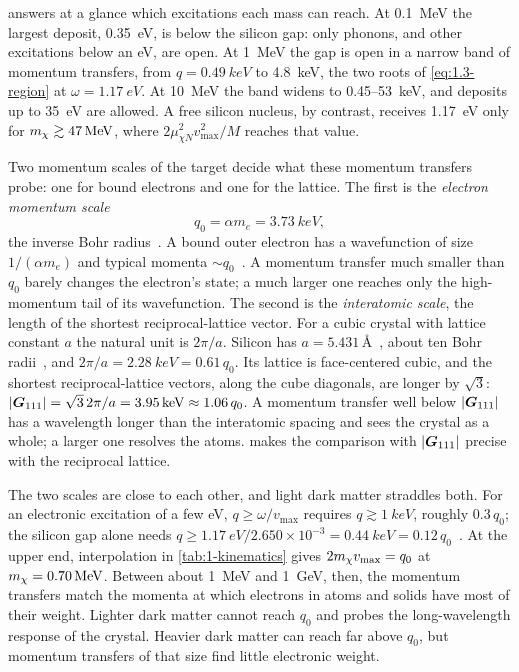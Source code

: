  answers at a glance which excitations each mass can reach. At \SI{0.1}{MeV} the largest deposit, \SI{0.35}{eV}, is below the silicon gap: only phonons, and other excitations below an eV, are open. At \SI{1}{MeV} the gap is open in a narrow band of momentum transfers, from $q = \SI{0.49}{keV}$ to \SI{4.8}{keV}, the two roots of \cref{eq:1.3-region} at $\omega = \SI{1.17}{eV}$. At \SI{10}{MeV} the band widens to 0.45--\SI{53}{keV}, and deposits up to \SI{35}{eV} are allowed. A free silicon nucleus, by contrast, receives \SI{1.17}{eV} only for $m_{\chi} \gtrsim \SI{47}{MeV}$, where $2\mu_{\chi N}^2v_{\mathrm{max}}^2/M$ reaches that value.

Two momentum scales of the target decide what these momentum transfers probe: one for bound electrons and one for the lattice. The first is the \emph{electron momentum scale}
\begin{equation}
  q_0 = \alpha m_e = \SI{3.73}{keV},
  \label{eq:1.3-q0}
\end{equation}
the inverse Bohr radius~\cite[Eq.~(121)]{kahn2022searches}. A bound outer electron has a wavefunction of size $1/(\alpha m_e)$ and typical momenta $\sim q_0$~\cite[Sect.~V\,A]{lin2019tasi}. A momentum transfer much smaller than $q_0$ barely changes the electron's state; a much larger one reaches only the high-momentum tail of its wavefunction. The second is the \emph{interatomic scale}, the length of the shortest reciprocal-lattice vector. For a cubic crystal with lattice constant $a$ the natural unit is $2\pi/a$. Silicon has $a = 5.431$\,\AA~\cite[lattice parameter of silicon]{mohr2025codata}, about ten Bohr radii~\cite[Sect.~V]{kahn2022searches}, and $2\pi/a = \SI{2.28}{keV} = 0.61\,q_0$. Its lattice is face-centered cubic, and the shortest reciprocal-lattice vectors, along the cube diagonals, are longer by $\sqrt{3}$: $|\bm{G}_{111}| = \sqrt{3}\,2\pi/a = \SI{3.95}{keV} \approx 1.06\,q_0$. A momentum transfer well below $|\bm{G}_{111}|$ has a wavelength longer than the interatomic spacing and sees the crystal as a whole; a larger one resolves the atoms.  makes the comparison with $|\bm{G}_{111}|$ precise with the reciprocal lattice.

The two scales are close to each other, and light dark matter straddles both. For an electronic excitation of a few eV, $q \ge \omega/v_{\mathrm{max}}$ requires $q \gtrsim \SI{1}{keV}$, roughly $0.3\,q_0$; the silicon gap alone needs $q \ge \SI{1.17}{eV}/2.650\times10^{-3} = \SI{0.44}{keV} = 0.12\,q_0$~\cite[Eq.~(123)]{kahn2022searches}. At the upper end, interpolation in \cref{tab:1-kinematics} gives $2m_{\chi} v_{\mathrm{max}} = q_0$ at $m_{\chi} = \SI{0.70}{MeV}$. Between about \SI{1}{MeV} and \SI{1}{GeV}, then, the momentum transfers match the momenta at which electrons in atoms and solids have most of their weight. Lighter dark matter cannot reach $q_0$ and probes the long-wavelength response of the crystal. Heavier dark matter can reach far above $q_0$, but momentum transfers of that size find little electronic weight.

